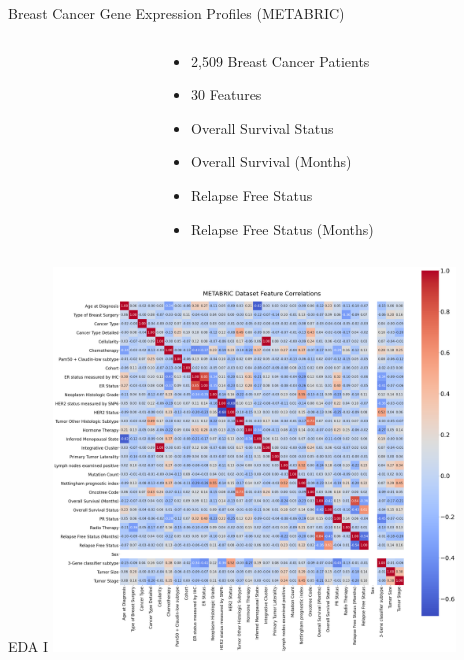 \documentclass{beamer}
\begin{document}
\begin{frame}{Breast Cancer Gene Expression Profiles (METABRIC)
}
\begin{columns}
\begin{column}{0.49\textwidth}
    \end{column}
    \begin{column}{0.49\textwidth}
        \begin{itemize}
            \item 2,509 Breast Cancer Patients
            \item 30 Features
            \item Overall Survival Status
            \item Overall Survival (Months)
            \item Relapse Free Status
            \item Relapse Free Status (Months)
        \end{itemize}
    \end{column}
\end{columns}
\end{frame}

\begin{frame}{EDA I}
    \centering
    \includegraphics[width = 0.8\textwidth]{images/corr.png}
\end{frame}
\end{document}
